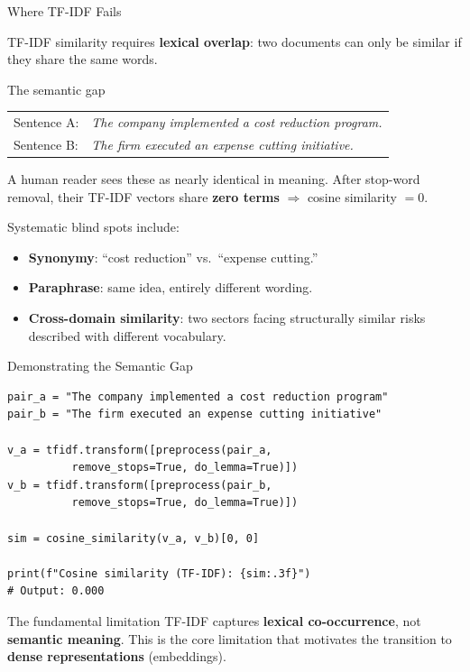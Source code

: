 \documentclass[aspectratio=169,11pt]{beamer}
\begin{document}
\begin{frame}{Where TF-IDF Fails}

TF-IDF similarity requires \textbf{lexical overlap}: two
documents can only be similar if they share the same words.

\vspace{6pt}
\begin{alertblock}{The semantic gap}
\small
\begin{tabular}{ll}
Sentence A: & \emph{The company implemented a cost reduction program.}\\
Sentence B: & \emph{The firm executed an expense cutting initiative.}\\
\end{tabular}

\vspace{4pt}
A human reader sees these as nearly identical in meaning.
After stop-word removal, their TF-IDF vectors share
\textbf{zero terms} $\Rightarrow$ cosine similarity
$= 0$.
\end{alertblock}

\vspace{6pt}
Systematic blind spots include:

\begin{itemize}
  \item \textbf{Synonymy}: ``cost reduction'' vs.\ ``expense cutting.''
  \item \textbf{Paraphrase}: same idea, entirely different wording.
  \item \textbf{Cross-domain similarity}: two sectors facing
        structurally similar risks described with different vocabulary.
\end{itemize}

\end{frame}

\begin{frame}[fragile]{Demonstrating the Semantic Gap}

\begin{lstlisting}
pair_a = "The company implemented a cost reduction program"
pair_b = "The firm executed an expense cutting initiative"

v_a = tfidf.transform([preprocess(pair_a,
          remove_stops=True, do_lemma=True)])
v_b = tfidf.transform([preprocess(pair_b,
          remove_stops=True, do_lemma=True)])

sim = cosine_similarity(v_a, v_b)[0, 0]

print(f"Cosine similarity (TF-IDF): {sim:.3f}")
# Output: 0.000
\end{lstlisting}

\vspace{6pt}
\begin{block}{The fundamental limitation}
TF-IDF captures \textbf{lexical co-occurrence}, not
\textbf{semantic meaning}. This is the core limitation
that motivates the transition to \textbf{dense
representations} (embeddings).
\end{block}

\end{frame}
\end{document}

